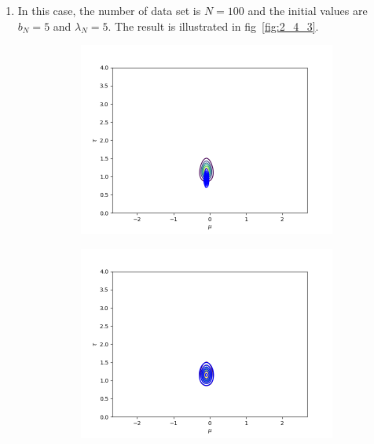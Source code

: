 \documentclass[11pt]{extarticle}
\newcommand{\0}{\mathbf{0}}
\renewcommand{\(}{\left(}
\renewcommand{\)}{\right)}
\theoremstyle{definition}
\begin{document}
\begin{enumerate}
	\item In this case, the number of data set is $N = 100$ and the initial values are $b_{N} = 5$ and $\lambda_{N} = 5$. The result is illustrated in fig~\ref{fig:2_4_3}.
	\begin{figure}[!ht]
		\centering
		\begin{subfigure}{.4\textwidth}
			\centering
			\includegraphics[width=\linewidth]{2_4_3_1}
		\end{subfigure}
		\begin{subfigure}{.4\textwidth}
			\centering
			\includegraphics[width=\linewidth]{2_4_3_2}
		\end{subfigure}
		\begin{subfigure}{.4\textwidth}

\end{subfigure}
\end{figure}
\end{enumerate}
\end{document}
